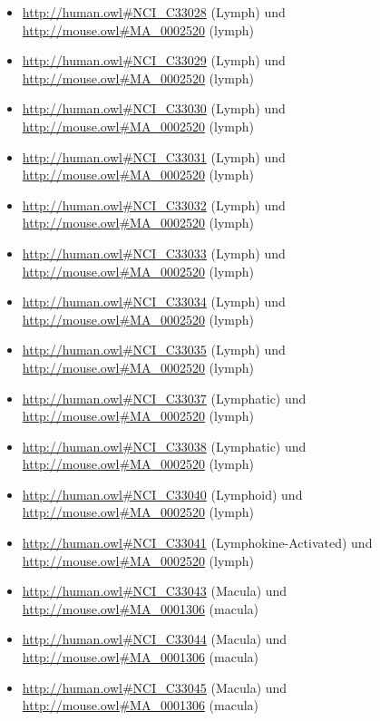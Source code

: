 \begin{itemize}
	\item \url{http://human.owl#NCI_C33028} (Lymph\textunderscoreNode\textunderscoreCapsule) und \url{http://mouse.owl#MA_0002520} (lymph)
	\item \url{http://human.owl#NCI_C33029} (Lymph\textunderscoreNode\textunderscoreCortex) und \url{http://mouse.owl#MA_0002520} (lymph)
	\item \url{http://human.owl#NCI_C33030} (Lymph\textunderscoreNode\textunderscoreEfferent\textunderscoreVessel) und \url{http://mouse.owl#MA_0002520} (lymph)
	\item \url{http://human.owl#NCI_C33031} (Lymph\textunderscoreNode\textunderscoreHilum) und \url{http://mouse.owl#MA_0002520} (lymph)
	\item \url{http://human.owl#NCI_C33032} (Lymph\textunderscoreNode\textunderscoreMedullary\textunderscorePortion) und \url{http://mouse.owl#MA_0002520} (lymph)
	\item \url{http://human.owl#NCI_C33033} (Lymph\textunderscoreNode\textunderscoreSinus) und \url{http://mouse.owl#MA_0002520} (lymph)
	\item \url{http://human.owl#NCI_C33034} (Lymph\textunderscoreNode\textunderscoreTissue) und \url{http://mouse.owl#MA_0002520} (lymph)
	\item \url{http://human.owl#NCI_C33035} (Lymph\textunderscoreNode\textunderscoreTrabecula) und \url{http://mouse.owl#MA_0002520} (lymph)
	\item \url{http://human.owl#NCI_C33037} (Lymphatic\textunderscoreCapillary) und \url{http://mouse.owl#MA_0002520} (lymph)
	\item \url{http://human.owl#NCI_C33038} (Lymphatic\textunderscoreVessel) und \url{http://mouse.owl#MA_0002520} (lymph)
	\item \url{http://human.owl#NCI_C33040} (Lymphoid\textunderscoreFollicle) und \url{http://mouse.owl#MA_0002520} (lymph)
	\item \url{http://human.owl#NCI_C33041} (Lymphokine-Activated\textunderscoreNatural\textunderscoreKiller\textunderscoreCell) und \url{http://mouse.owl#MA_0002520} (lymph)
	\item \url{http://human.owl#NCI_C33043} (Macula\textunderscoreDensa) und \url{http://mouse.owl#MA_0001306} (macula)
	\item \url{http://human.owl#NCI_C33044} (Macula\textunderscoreLutea) und \url{http://mouse.owl#MA_0001306} (macula)
	\item \url{http://human.owl#NCI_C33045} (Macula\textunderscoreof\textunderscoreSaccule) und \url{http://mouse.owl#MA_0001306} (macula)

\end{itemize}
